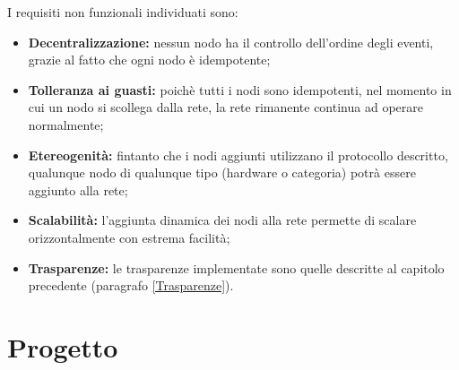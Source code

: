 \documentclass{memoir}
\begin{document}
I requisiti non funzionali individuati sono:
\begin{itemize}
\item \textbf{Decentralizzazione:} nessun nodo ha il controllo dell'ordine degli eventi, grazie al fatto che ogni nodo è idempotente;
\item \textbf{Tolleranza ai guasti:} poichè tutti i nodi sono idempotenti, nel momento in cui un nodo si scollega dalla rete, la rete rimanente continua ad operare normalmente;
\item \textbf{Etereogenità:} fintanto che i nodi aggiunti utilizzano il protocollo descritto, qualunque nodo di qualunque tipo (hardware o categoria) potrà essere aggiunto alla rete;
\item \textbf{Scalabilità:} l'aggiunta dinamica dei nodi alla rete permette di scalare orizzontalmente con estrema facilità;
\item \textbf{Trasparenze:} le trasparenze implementate sono quelle descritte al capitolo precedente (paragrafo \ref{Trasparenze}).
\end{itemize}

%
%
%
%
%



\chapter{Progetto}\label{ch:progetto}
\end{document}
